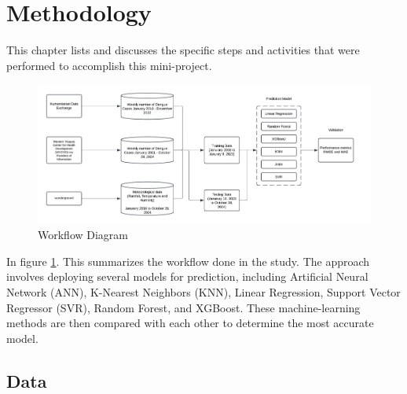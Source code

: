 \documentclass[runningheads]{llncs}
\begin{document}
\section{Methodology}
This chapter lists and discusses the specific steps and activities that were performed to accomplish this mini-project.

\begin{figure}[h!]
    \centering
    \includegraphics[width=1\linewidth]{image/Model Diagram.png}
    \caption{Workflow Diagram}
    \label{fig:workflow}
\end{figure}

In figure \ref{fig:workflow}. This summarizes the workflow done in the study. The approach involves deploying several models for prediction, including Artificial Neural Network (ANN), K-Nearest Neighbors (KNN), Linear Regression, Support Vector Regressor (SVR), Random Forest, and XGBoost. These machine-learning methods are then compared with each other to determine the most accurate model.

\subsection{Data}
\end{document}
